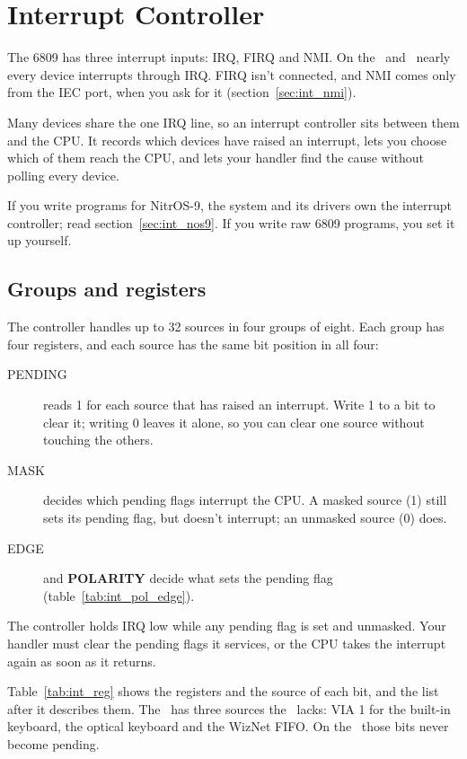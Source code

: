 \chapter{Interrupt Controller}
\label{chap:interrupts}

The 6809 has three interrupt inputs: IRQ, FIRQ and NMI. On the \jrtwo\ and \ktwo\ nearly every device interrupts through IRQ. FIRQ isn't connected, and NMI comes only from the IEC port, when you ask for it (section~\ref{sec:int_nmi}).

Many devices share the one IRQ line, so an interrupt controller sits between them and the CPU. It records which devices have raised an interrupt, lets you choose which of them reach the CPU, and lets your handler find the cause without polling every device.

If you write programs for NitrOS-9, the system and its drivers own the interrupt controller; read section~\ref{sec:int_nos9}. If you write raw 6809 programs, you set it up yourself.

\section{Groups and registers}

The controller handles up to 32 sources in four groups of eight. Each group has four registers, and each source has the same bit position in all four:

\begin{description}
    \item[PENDING] reads 1 for each source that has raised an interrupt. Write 1 to a bit to clear it; writing 0 leaves it alone, so you can clear one source without touching the others.
    \item[MASK] decides which pending flags interrupt the CPU. A masked source (1) still sets its pending flag, but doesn't interrupt; an unmasked source (0) does.
    \item[EDGE] and \textbf{POLARITY} decide what sets the pending flag (table~\ref{tab:int_pol_edge}).
\end{description}

The controller holds IRQ low while any pending flag is set and unmasked. Your handler must clear the pending flags it services, or the CPU takes the interrupt again as soon as it returns.

Table~\ref{tab:int_reg} shows the registers and the source of each bit, and the list after it describes them. The \ktwo\ has three sources the \jrtwo\ lacks: VIA 1 for the built-in keyboard, the optical keyboard and the WizNet FIFO. On the \jrtwo\ those bits never become pending.

